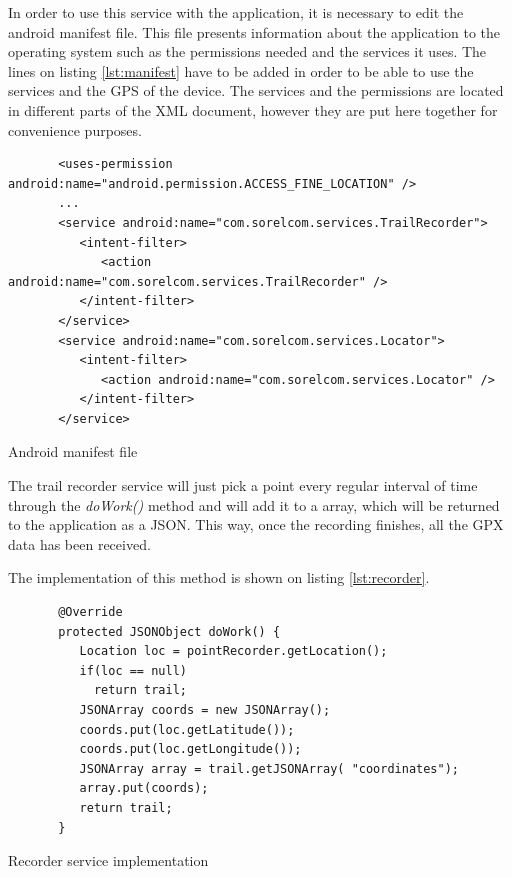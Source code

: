 In order to use this service with the application, it is necessary to edit the android manifest file. This file presents information about the application to the operating system such as the permissions needed and the services it uses. The lines on listing \ref{lst:manifest} have to be added in order to be able to use the services and the GPS of the device. The services and the permissions are located in different parts of the XML document, however they are put here together for convenience purposes.

\begin{listing}[ht]\centering
  \begin{minipage}{.8\textwidth}
    \begin{verbatim}
       <uses-permission android:name="android.permission.ACCESS_FINE_LOCATION" />
       ...
       <service android:name="com.sorelcom.services.TrailRecorder">
          <intent-filter>
             <action android:name="com.sorelcom.services.TrailRecorder" />
          </intent-filter>
       </service>
       <service android:name="com.sorelcom.services.Locator">
          <intent-filter>
             <action android:name="com.sorelcom.services.Locator" />
          </intent-filter>
       </service>
    \end{verbatim}
  \end{minipage}
  \caption{Android manifest file}\label{lst:manifest}
\end{listing}

The trail recorder service will just pick a point every regular interval of time through the \textit{doWork()} method and will add it to a array, which will be returned to the application as a JSON. This way, once the recording finishes, all the GPX data has been received.

The implementation of this method is shown on listing \ref{lst:recorder}.


\begin{listing}[ht]\centering
  \begin{minipage}{.8\textwidth}
    \begin{verbatim}
       @Override
       protected JSONObject doWork() {
          Location loc = pointRecorder.getLocation();
          if(loc == null)
            return trail;
          JSONArray coords = new JSONArray();
          coords.put(loc.getLatitude());
          coords.put(loc.getLongitude());
          JSONArray array = trail.getJSONArray( "coordinates");
          array.put(coords);
          return trail;
       }
    \end{verbatim}
  \end{minipage}
  \caption{Recorder service implementation}\label{lst:recorder}
\end{listing}

